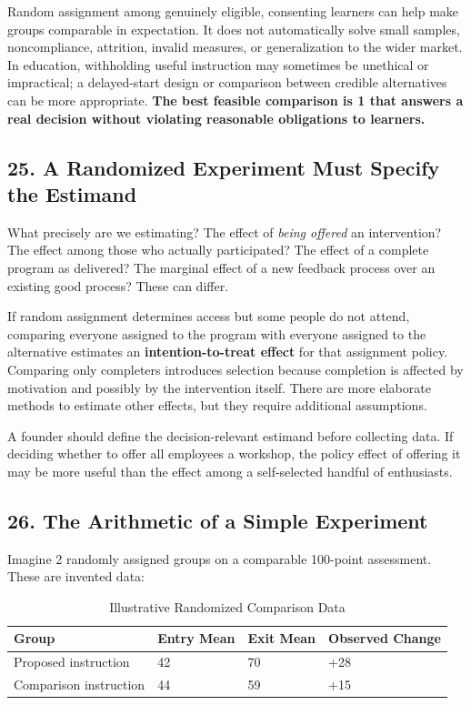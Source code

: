 Random assignment among genuinely eligible, consenting learners can help make groups comparable in expectation. It does not automatically solve small samples, noncompliance, attrition, invalid measures, or generalization to the wider market. In education, withholding useful instruction may sometimes be unethical or impractical; a delayed-start design or comparison between credible alternatives can be more appropriate. \textbf{The best feasible comparison is 1 that answers a real decision without violating reasonable obligations to learners.}

\subsection*{25. A Randomized Experiment Must Specify the Estimand}

What precisely are we estimating? The effect of \emph{being offered} an intervention? The effect among those who actually participated? The effect of a complete program as delivered? The marginal effect of a new feedback process over an existing good process? These can differ.

If random assignment determines access but some people do not attend, comparing everyone assigned to the program with everyone assigned to the alternative estimates an \textbf{intention-to-treat effect} for that assignment policy. Comparing only completers introduces selection because completion is affected by motivation and possibly by the intervention itself. There are more elaborate methods to estimate other effects, but they require additional assumptions.

A founder should define the decision-relevant estimand before collecting data. If deciding whether to offer all employees a workshop, the policy effect of offering it may be more useful than the effect among a self-selected handful of enthusiasts.

\subsection*{26. The Arithmetic of a Simple Experiment}

Imagine 2 randomly assigned groups on a comparable 100-point assessment. These are invented data:

\begin{table}[t]
\centering
\small
\caption{Illustrative Randomized Comparison Data}
\begin{tabularx}{\textwidth}{p{}p{}p{}X}
\toprule
\textbf{Group} & \textbf{Entry Mean} & \textbf{Exit Mean} & \textbf{Observed Change} \\
\midrule
Proposed instruction & 42 & 70 & +28 \\
Comparison instruction & 44 & 59 & +15 \\
\bottomrule
\end{tabularx}
\end{table}

